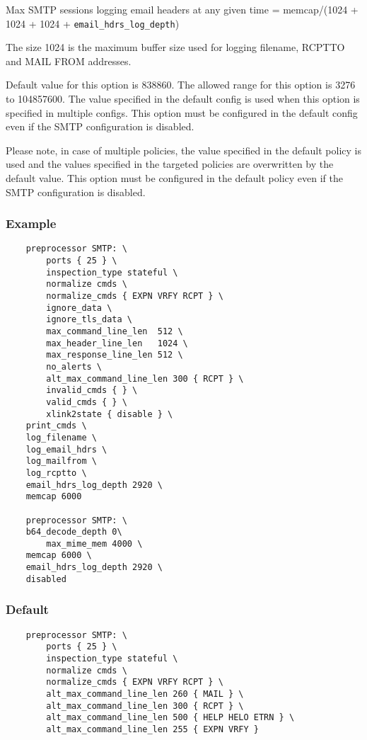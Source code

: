 \documentclass[english]{report}
\newcounter{slistnum}
\newenvironment{slist}
{ \begin{list}{ {\bf \arabic{slistnum}.} }{\usecounter{slistnum} } }
{ \end{list} }
\begin{document}
\begin{slist}
Max SMTP sessions logging email headers at any given time
                = memcap/(1024 + 1024 + 1024 + \texttt{email\_hdrs\_log\_depth})

The size 1024 is the maximum buffer size used for logging filename, RCPTTO and MAIL FROM addresses.

Default value for this option is 838860. The allowed range for this option is 3276 to 104857600.
The value specified in the default config is used when this option is specified in multiple configs.
This option must be configured in the default config even if the SMTP configuration is disabled.

Please note, in case of multiple policies, the value specified in the default policy is used and the values 
specified in the targeted policies are overwritten by the default value.                                                  
This option must be configured in the default policy even if the SMTP configuration is disabled.

\end{slist}

\subsubsection{Example}

\begin{verbatim}
    preprocessor SMTP: \
        ports { 25 } \
        inspection_type stateful \
        normalize cmds \
        normalize_cmds { EXPN VRFY RCPT } \
        ignore_data \
        ignore_tls_data \
        max_command_line_len  512 \
        max_header_line_len   1024 \
        max_response_line_len 512 \
        no_alerts \
        alt_max_command_line_len 300 { RCPT } \
        invalid_cmds { } \
        valid_cmds { } \
        xlink2state { disable } \
	print_cmds \
	log_filename \
	log_email_hdrs \
	log_mailfrom \
	log_rcptto \
	email_hdrs_log_depth 2920 \
	memcap 6000

    preprocessor SMTP: \
	b64_decode_depth 0\
        max_mime_mem 4000 \
	memcap 6000 \
	email_hdrs_log_depth 2920 \
	disabled
\end{verbatim}

\subsubsection{Default}

\begin{verbatim}
    preprocessor SMTP: \
        ports { 25 } \
        inspection_type stateful \
        normalize cmds \
        normalize_cmds { EXPN VRFY RCPT } \
        alt_max_command_line_len 260 { MAIL } \
        alt_max_command_line_len 300 { RCPT } \
        alt_max_command_line_len 500 { HELP HELO ETRN } \
        alt_max_command_line_len 255 { EXPN VRFY }
\end{verbatim}
\end{document}
